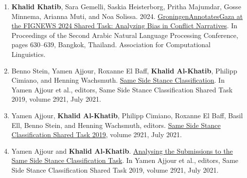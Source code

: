 \begin{enumerate}
 \item \textbf{Khalid Khatib}, Sara Gemelli, Saskia Heisterborg, Pritha Majumdar, Gosse Minnema, Arianna Muti, and Noa Solissa. 2024. \href{https://aclanthology.org/2024.arabicnlp-1.68/}{GroningenAnnotatesGaza at the FIGNEWS 2024 Shared Task: Analyzing Bias in Conflict Narratives}. In Proceedings of the Second Arabic Natural Language Processing Conference, pages 630–639, Bangkok, Thailand. Association for Computational Linguistics.
\item{Benno Stein, Yamen Ajjour, Roxanne El Baff, \textbf{Khalid Al-Khatib}, Philipp Cimiano, and Henning Wachsmuth. \href{https://ceur-ws.org/Vol-2921/overview.pdf}{Same Side Stance Classification}. In Yamen Ajjour et al., editors, Same Side Stance Classification Shared Task 2019, volume 2921, July 2021.}
\item{Yamen Ajjour, \textbf{Khalid Al-Khatib}, Philipp Cimiano, Roxanne El Baff, Basil Ell, Benno Stein, and Henning Wachsmuth, editors. \href{https://ceur-ws.org/Vol-2921/}{Same Side Stance Classification Shared Task 2019}, volume 2921, July 2021.}

\item{Yamen Ajjour and \textbf{Khalid Al-Khatib}. \href{https://ceur-ws.org/Vol-2921/invited.pdf}{Analysing the Submissions to the Same Side Stance Classification Task}. In Yamen Ajjour et al., editors, Same Side Stance Classification Shared Task 2019, volume 2921, July 2021.}



\end{enumerate}
